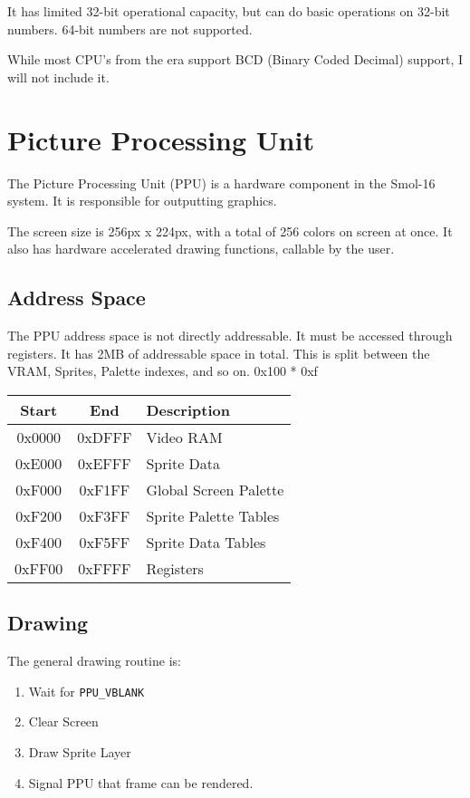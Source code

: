 \documentclass[10pt,a4paper]{article}
\def\tcode#1{\texttt{#1}}
\begin{document}
			It has limited 32-bit operational capacity, but can do basic operations on 32-bit numbers.
			64-bit numbers are not supported.
			
			While most CPU's from the era support BCD (Binary Coded Decimal) support, I will not include it.
	\section[PPU]{Picture Processing Unit}
		The Picture Processing Unit (PPU) is a hardware component in the Smol-16 system. It is responsible for outputting graphics. 
		
		The screen size is 256px x 224px, with a total of 256 colors on screen at once. It also has hardware accelerated drawing functions, callable by the user.
		
		\subsection{Address Space}
		The PPU address space is not directly addressable. It must be accessed through registers. It has 2MB of addressable space in total. This is split between the VRAM, Sprites, Palette indexes, and so on.
		0x100 * 0xf 
		\begin{table}[h]
			\centering
			\begin{tabular}{|c|c|l|}
				\hline
				Start & End & Description \\
				\hline
				0x0000 & 0xDFFF & Video RAM \\
				0xE000 & 0xEFFF & Sprite Data \\
				0xF000 & 0xF1FF & Global Screen Palette \\
				0xF200 & 0xF3FF & Sprite Palette Tables \\
				0xF400 & 0xF5FF & Sprite Data Tables \\
				0xFF00 & 0xFFFF & Registers \\
				\hline
			\end{tabular}
		\end{table}
		
		\subsection{Drawing}{}
			The general drawing routine is:
			\begin{enumerate}
				\item Wait for \tcode{PPU\_VBLANK}
				\item Clear Screen
				\item Draw Sprite Layer
				\item Signal PPU that frame can be rendered.
			\end{enumerate}
			
\end{document}
